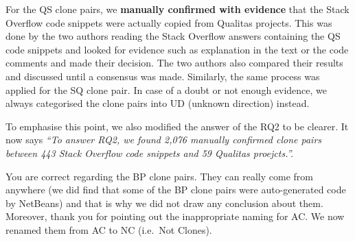 \documentclass[a4paper,twoside,10pt]{reviewresponse}
\begin{document}
For the QS clone pairs, we \textbf{manually confirmed with evidence} that the Stack Overflow code snippets were actually copied from Qualitas projects. This was done by the two authors reading the Stack Overflow answers containing the QS code snippets and looked for evidence such as explanation in the text or the code comments and made their decision. The two authors also compared their results and discussed until a consensus was made. Similarly, the same process was applied for the SQ clone pair. 
In case of a doubt or not enough evidence, we always categorised the clone pairs into UD (unknown direction) instead. 

To emphasise this point, we also modified the answer of the RQ2 to be clearer. It now says \textit{``To answer RQ2, we found 2,076 manually confirmed clone pairs between 443 Stack Overflow code snippets
and 59 Qualitas proejcts.''.}


You are correct regarding the BP clone pairs. They can really come from anywhere (we did find that some of the BP clone pairs were auto-generated code by NetBeans) and that is why we did not draw any conclusion about them. 
Moreover, thank you for pointing out the inappropriate naming for AC. We now renamed them from AC to NC (i.e.~Not Clones).
\end{document}
